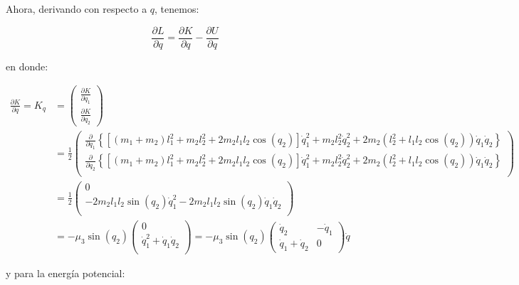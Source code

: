 \documentclass{article}
\begin{document}
Ahora, derivando con respecto a \(q\), tenemos:

\[
\frac{\partial L}{\partial q} = \frac{\partial K}{\partial q} - \frac{\partial U}{\partial q}
\]

en donde:

\[
\begin{align}
\frac{\partial K}{\partial q} = K_{q} &=
\begin{pmatrix}
\frac{\partial K}{\partial q_1} \\
\frac{\partial K}{\partial q_2}
\end{pmatrix} \\
&= \frac{1}{2}
\begin{pmatrix}
\frac{\partial}{\partial q_1} \left\{ \left[ (m_1 + m_2) l_1^2 + m_2 l_2^2 + 2 m_2 l_1 l_2 \cos{(q_2)} \right] \dot{q}_1^2 + m_2 l_2^2 \dot{q}_2^2 + 2 m_2 \left( l_2^2 + l_1 l_2 \cos{(q_2)} \right) \dot{q}_1 \dot{q}_2 \right\} \\
\frac{\partial}{\partial q_2} \left\{ \left[ (m_1 + m_2) l_1^2 + m_2 l_2^2 + 2 m_2 l_1 l_2 \cos{(q_2)} \right] \dot{q}_1^2 + m_2 l_2^2 \dot{q}_2^2 + 2 m_2 \left( l_2^2 + l_1 l_2 \cos{(q_2)} \right) \dot{q}_1 \dot{q}_2 \right\} \\
\end{pmatrix} \\
&= \frac{1}{2}
\begin{pmatrix}
0 \\
-2 m_2 l_1 l_2 \sin{(q_2)} \dot{q}_1^2 - 2 m_2 l_1 l_2 \sin{(q_2)} \dot{q}_1 \dot{q}_2 \\
\end{pmatrix} \\
&= - \mu_3 \sin{(q_2)}
\begin{pmatrix}
0 \\
\dot{q}_1^2 + \dot{q}_1 \dot{q}_2 \\
\end{pmatrix} = -\mu_3 \sin{(q_2)}
\begin{pmatrix}
\dot{q}_2 & -\dot{q}_1 \\
\dot{q}_1 + \dot{q}_2 & 0
\end{pmatrix} \dot{q}
\end{align}
\]

y para la energía potencial:
\end{document}
